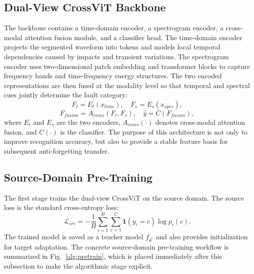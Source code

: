\documentclass[conference,letterpaper]{IEEEtran}\IEEEoverridecommandlockouts
\begin{document}
\subsection{Dual-View CrossViT Backbone}
The backbone contains a time-domain encoder, a spectrogram encoder, a cross-modal attention fusion module, and a classifier head. The time-domain encoder projects the segmented waveform into tokens and models local temporal dependencies caused by impacts and transient variations. The spectrogram encoder uses two-dimensional patch embedding and transformer blocks to capture frequency bands and time-frequency energy structures. The two encoded representations are then fused at the modality level so that temporal and spectral cues jointly determine the fault category:
\begin{equation}
F_t=E_t(x_{time}),\quad F_s=E_s(x_{spec}),
\end{equation}
\begin{equation}
F_{fusion}=A_{cross}(F_t,F_s),\quad \hat{y}=C(F_{fusion}),
\end{equation}
where $E_t$ and $E_s$ are the two encoders, $A_{cross}(\cdot)$ denotes cross-modal attention fusion, and $C(\cdot)$ is the classifier. The purpose of this architecture is not only to improve recognition accuracy, but also to provide a stable feature basis for subsequent anti-forgetting transfer.

\subsection{Source-Domain Pre-Training}
The first stage trains the dual-view CrossViT on the source domain. The source loss is the standard cross-entropy loss:
\begin{equation}
\mathcal{L}_{src}=-\frac{1}{B}\sum_{i=1}^{B}\sum_{c=1}^{C}\mathbf{1}(y_i=c)\log p_i(c).
\end{equation}
The trained model is saved as a teacher model $f_{\theta^*}$ and also provides initialization for target adaptation. The concrete source-domain pre-training workflow is summarized in Fig.~\ref{alg:pretrain}, which is placed immediately after this subsection to make the algorithmic stage explicit.
\end{document}
